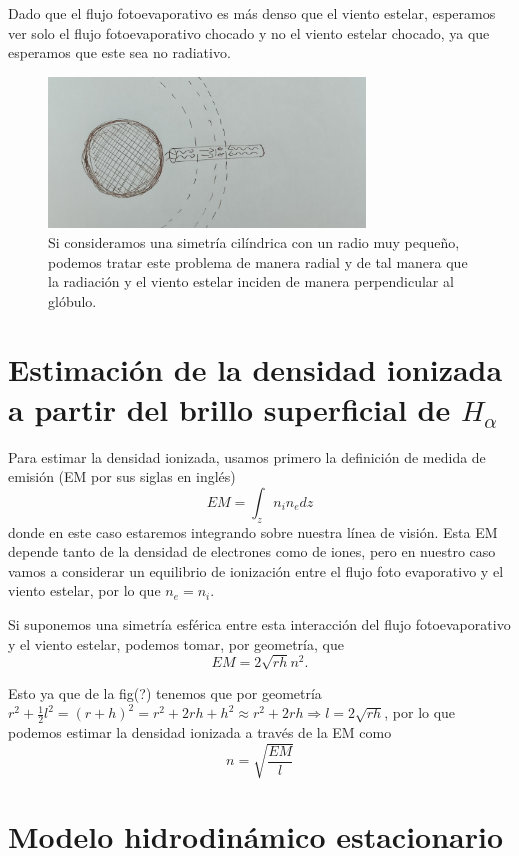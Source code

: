\documentclass{book}
\begin{document}
Dado que el flujo fotoevaporativo es más denso que el viento estelar, esperamos ver solo el flujo fotoevaporativo chocado y no el viento estelar chocado, ya que esperamos que este sea no radiativo.

\begin{figure}[h]
    \centering
    \includegraphics[width=0.75\textwidth]{Chp2_cilinders.jpg}
    \caption{Si consideramos una simetría cilíndrica con un radio muy pequeño, podemos tratar este problema de manera radial y de tal manera que la radiación y el viento estelar inciden de manera perpendicular al glóbulo.}
    \label{fig:cilinders}
\end{figure}

\section{Estimación de la densidad ionizada a partir del brillo superficial de $H_\alpha$}

Para estimar la densidad ionizada, usamos primero la definición de medida de emisión (EM por sus siglas en inglés)
\[EM=\int_z n_in_edz\] donde en este caso estaremos integrando sobre nuestra línea de visión. Esta EM depende tanto de la densidad de electrones como de iones, pero en nuestro caso vamos a considerar un equilibrio de ionización entre el flujo foto evaporativo y el viento estelar, por lo que $n_e=n_i$.

Si suponemos una simetría esférica entre esta interacción del flujo fotoevaporativo y el viento estelar, podemos tomar, por geometría, que
\[EM=2\sqrt{rh}n^2.\]


Esto ya que de la fig(?) tenemos que por geometría $r^2+\frac{1}{2}l^2=(r+h)^2=r^2+2rh+h^2\approx r^2+2rh\Rightarrow l=2\sqrt{rh}$, por lo que podemos estimar la densidad ionizada a través de la EM como \[n=\sqrt{\frac{EM}{l}}\]

\section{Modelo hidrodinámico estacionario}
\end{document}
